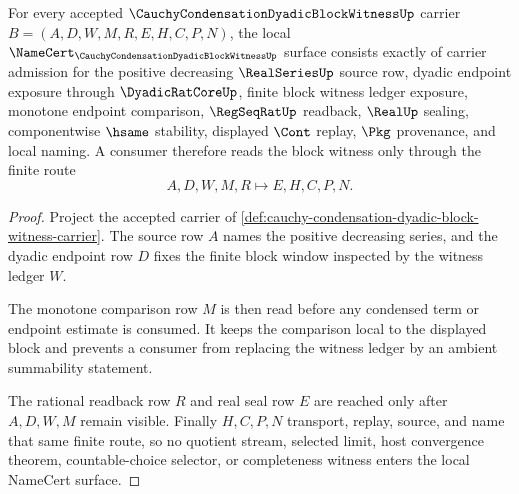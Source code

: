 \begin{theorem}
\label{thm:cauchy-condensation-dyadic-block-witness-namecert-obligations}
For every accepted $\CauchyCondensationDyadicBlockWitnessUp$ carrier $B=(A,D,W,M,R,E,H,C,P,N)$, the local $\NameCert_{\CauchyCondensationDyadicBlockWitnessUp}$ surface consists exactly of carrier admission for the positive decreasing $\RealSeriesUp$ source row, dyadic endpoint exposure through $\DyadicRatCoreUp$, finite block witness ledger exposure, monotone endpoint comparison, $\RegSeqRatUp$ readback, $\RealUp$ sealing, componentwise $\hsame$ stability, displayed $\Cont$ replay, $\Pkg$ provenance, and local naming. A consumer therefore reads the block witness only through the finite route
$$
A,D,W,M,R \longmapsto E,H,C,P,N .
$$
\end{theorem}
\begin{proof}
Project the accepted carrier of \autoref{def:cauchy-condensation-dyadic-block-witness-carrier}. The source row $A$ names the positive decreasing series, and the dyadic endpoint row $D$ fixes the finite block window inspected by the witness ledger $W$.

The monotone comparison row $M$ is then read before any condensed term or endpoint estimate is consumed. It keeps the comparison local to the displayed block and prevents a consumer from replacing the witness ledger by an ambient summability statement.

The rational readback row $R$ and real seal row $E$ are reached only after $A,D,W,M$ remain visible. Finally $H,C,P,N$ transport, replay, source, and name that same finite route, so no quotient stream, selected limit, host convergence theorem, countable-choice selector, or completeness witness enters the local NameCert surface.
\end{proof}

